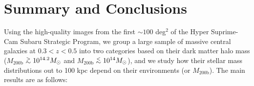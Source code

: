 \documentclass[a4paper,fleqn,usenatbib]{mnras}
\def\simlt{\lower.5ex\hbox{$\; \buildrel < \over {\sim} \;$}}
\def\simgt{\lower.5ex\hbox{$\; \buildrel > \over {\sim} \;$}}
\def\mhalo{{$M_{\mathrm{200b}}$}}
\begin{document}

\section{Summary and Conclusions}
    \label{sec:summary}
    
    Using the high-quality images from the first $\sim100$ deg$^2$ of the 
    Hyper Suprime-Cam Subaru Strategic Program, we group a large sample of massive 
    central galaxies at $0.3 < z < 0.5$ into two categories based on their dark matter
    halo mass (\mhalo{}$\simgt 10^{14.2} M_{\odot}$ and 
    \mhalo{}$\simlt 10^{14} M_{\odot}$), and we study how their stellar mass distributions 
    out to 100 kpc depend on their environments (or \mhalo{}). 
    The main results are as follows:  
    
\end{document}
